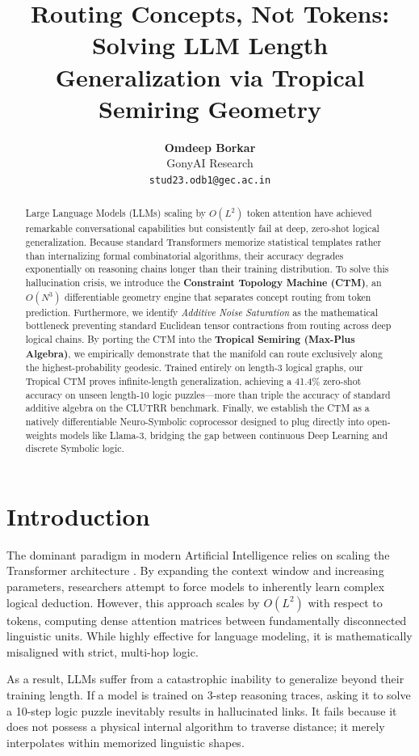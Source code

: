 \documentclass[11pt,a4paper]{article}
\title{\textbf{Routing Concepts, Not Tokens: Solving LLM Length Generalization via Tropical Semiring Geometry}}
\author{
  \textbf{Omdeep Borkar} \\
  GonyAI Research \\
  \texttt{stud23.odb1@gec.ac.in}
}
\date{}
\begin{document}
\maketitle

\begin{abstract}
Large Language Models (LLMs) scaling by $O(L^2)$ token attention have achieved remarkable conversational capabilities but consistently fail at deep, zero-shot logical generalization. Because standard Transformers memorize statistical templates rather than internalizing formal combinatorial algorithms, their accuracy degrades exponentially on reasoning chains longer than their training distribution. To solve this hallucination crisis, we introduce the \textbf{Constraint Topology Machine (CTM)}, an $O(N^3)$ differentiable geometry engine that separates concept routing from token prediction. Furthermore, we identify \textit{Additive Noise Saturation} as the mathematical bottleneck preventing standard Euclidean tensor contractions from routing across deep logical chains. By porting the CTM into the \textbf{Tropical Semiring (Max-Plus Algebra)}, we empirically demonstrate that the manifold can route exclusively along the highest-probability geodesic. Trained entirely on length-3 logical graphs, our Tropical CTM proves infinite-length generalization, achieving a 41.4\% zero-shot accuracy on unseen length-10 logic puzzles—more than triple the accuracy of standard additive algebra on the CLUTRR benchmark. Finally, we establish the CTM as a natively differentiable Neuro-Symbolic coprocessor designed to plug directly into open-weights models like Llama-3, bridging the gap between continuous Deep Learning and discrete Symbolic logic.
\end{abstract}

\section{Introduction}
The dominant paradigm in modern Artificial Intelligence relies on scaling the Transformer architecture \cite{vaswani2017attention}. By expanding the context window and increasing parameters, researchers attempt to force models to inherently learn complex logical deduction. However, this approach scales by $O(L^2)$ with respect to tokens, computing dense attention matrices between fundamentally disconnected linguistic units. While highly effective for language modeling, it is mathematically misaligned with strict, multi-hop logic. 

As a result, LLMs suffer from a catastrophic inability to generalize beyond their training length. If a model is trained on 3-step reasoning traces, asking it to solve a 10-step logic puzzle inevitably results in hallucinated links. It fails because it does not possess a physical internal algorithm to traverse distance; it merely interpolates within memorized linguistic shapes.
\end{document}

